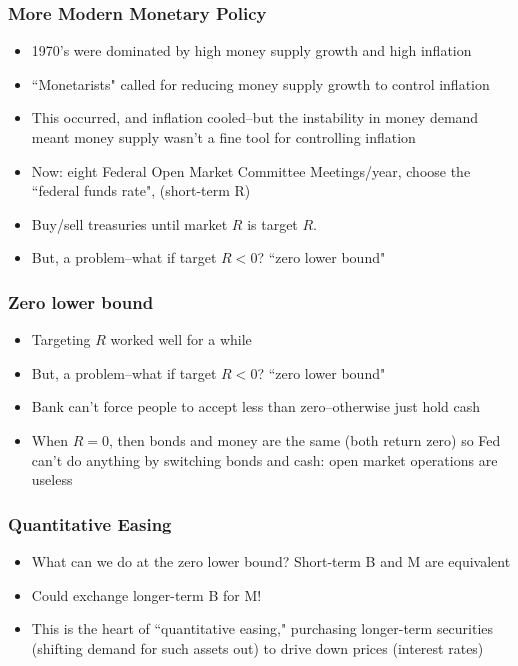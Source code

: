 \documentclass{beamer}
\begin{document}
\begin{frame}
\frametitle[alignment=center]{More Modern Monetary Policy}
\begin{itemize}
\item 1970's were dominated by high money supply growth and high inflation
\bigskip
\item ``Monetarists" called for reducing money supply growth to control inflation
\bigskip
\item This occurred, and inflation cooled--but the instability in money demand meant money supply wasn't a fine tool for controlling inflation
\bigskip
\item Now:  eight Federal Open Market Committee Meetings/year, choose the ``federal funds rate", (short-term R)
\bigskip
\item Buy/sell treasuries until market $R$ is target $R$.
\bigskip
\item But, a problem--what if target $R<0$?  ``zero lower bound"
\end{itemize}
\end{frame}

\begin{frame}
\frametitle[alignment=center]{Zero lower bound}
\begin{itemize}
\item Targeting $R$ worked well for a while
\bigskip
\item But, a problem--what if target $R<0$?  ``zero lower bound"
\bigskip
\item Bank can't force people to accept less than zero--otherwise just hold cash
\bigskip
\item When $R=0$, then bonds and money are the same (both return zero) so Fed can't do anything by switching bonds and cash: open market operations are useless 
\end{itemize}
\end{frame}

\begin{frame}
\frametitle[alignment=center]{Quantitative Easing}
\begin{itemize}
\item What can we do at the zero lower bound?  Short-term B and M are equivalent
\bigskip
\item Could exchange longer-term B for M!
\bigskip
\item This is the heart of ``quantitative easing," purchasing longer-term securities (shifting demand for such assets out) to drive down prices (interest rates)
\end{itemize}
\end{frame}
\end{document}
